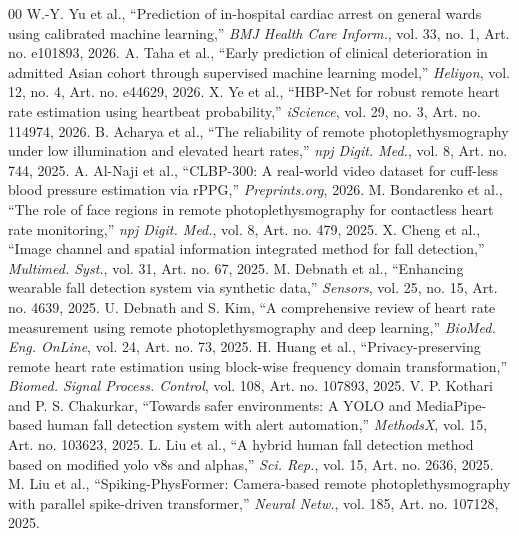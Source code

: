 \documentclass[conference]{IEEEtran}
\begin{document}
\begin{thebibliography}{00}
 W.-Y. Yu et al., ``Prediction of in-hospital cardiac arrest on general wards using calibrated machine learning,'' \emph{BMJ Health Care Inform.}, vol. 33, no. 1, Art. no. e101893, 2026.
 A. Taha et al., ``Early prediction of clinical deterioration in admitted Asian cohort through supervised machine learning model,'' \emph{Heliyon}, vol. 12, no. 4, Art. no. e44629, 2026.
 X. Ye et al., ``HBP-Net for robust remote heart rate estimation using heartbeat probability,'' \emph{iScience}, vol. 29, no. 3, Art. no. 114974, 2026.
 B. Acharya et al., ``The reliability of remote photoplethysmography under low illumination and elevated heart rates,'' \emph{npj Digit. Med.}, vol. 8, Art. no. 744, 2025.
 A. Al-Naji et al., ``CLBP-300: A real-world video dataset for cuff-less blood pressure estimation via rPPG,'' \emph{Preprints.org}, 2026.
 M. Bondarenko et al., ``The role of face regions in remote photoplethysmography for contactless heart rate monitoring,'' \emph{npj Digit. Med.}, vol. 8, Art. no. 479, 2025.
 X. Cheng et al., ``Image channel and spatial information integrated method for fall detection,'' \emph{Multimed. Syst.}, vol. 31, Art. no. 67, 2025.
 M. Debnath et al., ``Enhancing wearable fall detection system via synthetic data,'' \emph{Sensors}, vol. 25, no. 15, Art. no. 4639, 2025.
 U. Debnath and S. Kim, ``A comprehensive review of heart rate measurement using remote photoplethysmography and deep learning,'' \emph{BioMed. Eng. OnLine}, vol. 24, Art. no. 73, 2025.
 H. Huang et al., ``Privacy-preserving remote heart rate estimation using block-wise frequency domain transformation,'' \emph{Biomed. Signal Process. Control}, vol. 108, Art. no. 107893, 2025.
 V. P. Kothari and P. S. Chakurkar, ``Towards safer environments: A YOLO and MediaPipe-based human fall detection system with alert automation,'' \emph{MethodsX}, vol. 15, Art. no. 103623, 2025.
 L. Liu et al., ``A hybrid human fall detection method based on modified yolo v8s and alphas,'' \emph{Sci. Rep.}, vol. 15, Art. no. 2636, 2025.
 M. Liu et al., ``Spiking-PhysFormer: Camera-based remote photoplethysmography with parallel spike-driven transformer,'' \emph{Neural Netw.}, vol. 185, Art. no. 107128, 2025.
\end{thebibliography}
\end{document}
